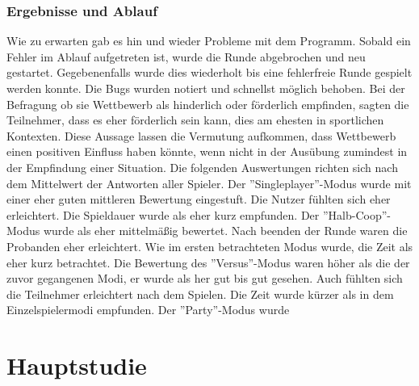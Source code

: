 \subsection{Ergebnisse und Ablauf}
Wie zu erwarten gab es hin und wieder Probleme mit dem Programm. Sobald ein Fehler im Ablauf aufgetreten ist, wurde die Runde abgebrochen und neu gestartet. Gegebenenfalls wurde dies wiederholt bis eine fehlerfreie Runde gespielt werden konnte. Die Bugs wurden notiert und schnellst möglich behoben.\newline
Bei der Befragung ob sie Wettbewerb als hinderlich oder förderlich empfinden, sagten die Teilnehmer, dass es eher förderlich sein kann, dies am ehesten in sportlichen Kontexten. Diese Aussage lassen die Vermutung aufkommen, dass Wettbewerb einen positiven Einfluss haben könnte, wenn nicht in der Ausübung zumindest in der Empfindung einer Situation.
Die folgenden Auswertungen richten sich nach dem Mittelwert der Antworten aller Spieler.
Der ''Singleplayer''-Modus wurde mit einer eher guten mittleren Bewertung eingestuft. Die Nutzer fühlten sich eher erleichtert. Die Spieldauer wurde als eher kurz empfunden.
Der ''Halb-Coop''-Modus  wurde als eher mittelmäßig bewertet. Nach beenden der Runde waren die Probanden eher erleichtert. Wie im ersten betrachteten Modus wurde, die Zeit als eher kurz betrachtet.
Die Bewertung des ''Versus''-Modus waren höher als die der zuvor gegangenen Modi, er wurde als her gut bis gut gesehen.  Auch fühlten sich die Teilnehmer erleichtert nach dem Spielen. Die Zeit wurde kürzer als in dem Einzelspielermodi empfunden.
Der ''Party''-Modus wurde 


\chapter{Hauptstudie}
